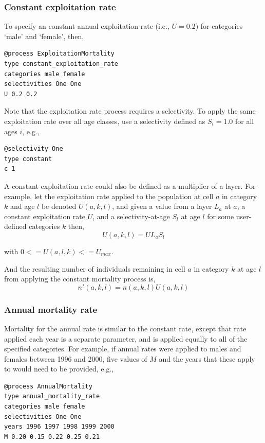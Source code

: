 \subsubsection*{Constant exploitation rate}

To specify an constant annual exploitation rate (i.e., $U=0.2$) for categories `male' and `female', then, 
{\small{\begin{verbatim}
@process ExploitationMortality
type constant_exploitation_rate
categories male female
selectivities One One
U 0.2 0.2
\end{verbatim}}}

Note that the exploitation rate process requires a selectivity. To apply the same exploitation rate over all age classes, use a selectivity defined as $S_i=1.0$ for all ages $i$, e.g.,
{\small{\begin{verbatim}
@selectivity One
type constant
c 1
\end{verbatim}}}

A constant exploitation rate could also be defined as a multiplier of a layer. For example, let the exploitation rate applied to the population at cell $a$ in category $k$ and age $l$ be denoted $U(a,k,l)$, and given a value from a layer $L_a$  at $a$, a constant exploitation rate $U$, and a selectivity-at-age $S_l$ at age $l$ for some user-defined categories $k$ then, 
\begin{equation}
  U(a,k,l) = U L_a S_l 
\end{equation}

with $0<=U(a,l,k)<=U_{max}$.

And the resulting number of individuals remaining in cell $a$ in category $k$ at age $l$ from applying the constant mortality process is,
\begin{equation}
  n'(a,k,l) = n(a,k,l) U(a,k,l)
\end{equation}

\subsubsection*{Annual mortality rate}

Mortality for the annual rate is similar to the constant rate, except that rate applied each year is a separate parameter, and is applied equally to all of the specified categories. For example, if annual rates were applied to males and females between 1996 and 2000, five values of $M$ and the years that these apply to would need to be provided, e.g., 
{\small{\begin{verbatim}
@process AnnualMortality
type annual_mortality_rate
categories male female
selectivities One One
years 1996 1997 1998 1999 2000
M 0.20 0.15 0.22 0.25 0.21
\end{verbatim}}}


